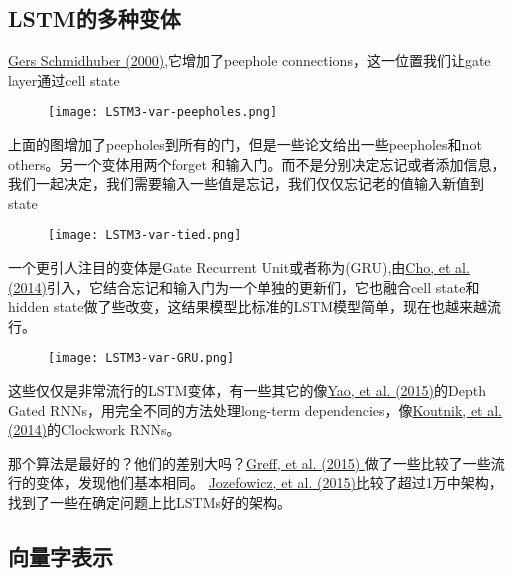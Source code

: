 \subsection{LSTM的多种变体}
\href{ftp://ftp.idsia.ch/pub/juergen/TimeCount-IJCNN2000.pdf}{Gers  Schmidhuber (2000)},它增加了peephole connections，这一位置我们让gate layer通过cell state
\begin{figure}
\centering
\texttt{[image: LSTM3-var-peepholes.png]}
\end{figure}
上面的图增加了peepholes到所有的门，但是一些论文给出一些peepholes和not others。另一个变体用两个forget 和输入门。而不是分别决定忘记或者添加信息，我们一起决定，我们需要输入一些值是忘记，我们仅仅忘记老的值输入新值到state
\begin{figure}
\centering
\texttt{[image: LSTM3-var-tied.png]}
\end{figure}
一个更引人注目的变体是Gate Recurrent Unit或者称为(GRU),由\href{http://arxiv.org/pdf/1406.1078v3.pdf}{Cho, et al. (2014)}引入，它结合忘记和输入门为一个单独的更新们，它也融合cell state和hidden state做了些改变，这结果模型比标准的LSTM模型简单，现在也越来越流行。
\begin{figure}
\centering
\texttt{[image: LSTM3-var-GRU.png]}
\end{figure}
这些仅仅是非常流行的LSTM变体，有一些其它的像\href{http://arxiv.org/pdf/1508.03790v2.pdf}{Yao, et al. (2015)}的Depth Gated RNNs，用完全不同的方法处理long-term dependencies，像\href{http://arxiv.org/pdf/1402.3511v1.pdf}{Koutnik, et al. (2014)}的Clockwork RNNs。\par
那个算法是最好的？他们的差别大吗？\href{http://arxiv.org/pdf/1503.04069.pdf}{Greff, et al. (2015) }做了一些比较了一些流行的变体，发现他们基本相同。
\href{http://jmlr.org/proceedings/papers/v37/jozefowicz15.pdf}{Jozefowicz, et al. (2015)}比较了超过1万中架构，找到了一些在确定问题上比LSTMs好的架构。
\subsection{向量字表示}
